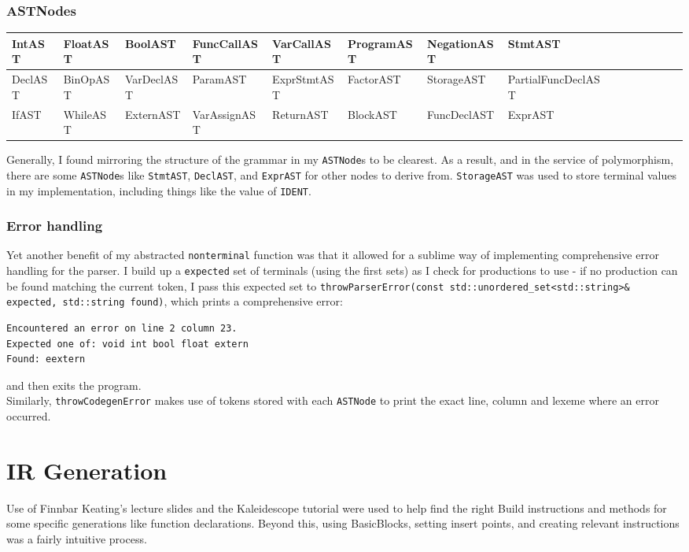 \documentclass[10pt,a4paper]{article}
\newcommand{\code}[1]{\lstinline!#1!}
\begin{document}
\subsubsection*{ASTNodes}
\begin{table}[htbp]
    \centering
    \begin{adjustbox}{center}
    \begin{tabular}{|l|l|l|l|l|l|l|l|l|l|l|l|l|l|l|}
    \hline
    IntAST & FloatAST & BoolAST & FuncCallAST & VarCallAST & ProgramAST & NegationAST & StmtAST\\
    \hline
    DeclAST & BinOpAST & VarDeclAST & ParamAST & ExprStmtAST&FactorAST & StorageAST & PartialFuncDeclAST\\
    \hline
    IfAST & WhileAST & ExternAST & VarAssignAST & ReturnAST & BlockAST & FuncDeclAST & ExprAST\\
    \hline
    \end{tabular}
\end{adjustbox}
\end{table}
\noindent Generally, I found mirroring the structure of the grammar in my \code{ASTNode}s to be clearest. As a result, and in the service of polymorphism, there are some \code{ASTNode}s like \code{StmtAST}, \code{DeclAST}, and \code{ExprAST} for other nodes to derive from.
\code{StorageAST} was used to store terminal values in my implementation, including things like the value of \code{IDENT}.
\subsubsection*{Error handling}
Yet another benefit of my abstracted \code{nonterminal} function was that it allowed for a sublime way of implementing comprehensive error handling for the parser. I build up a \code{expected} set of terminals (using the first sets) as I check for productions to use - if no production can be found matching the current token, I pass this expected set to \code{throwParserError(const std::unordered_set<std::string>& expected, std::string found)}, which prints a comprehensive error:
\begin{lstlisting}[]
Encountered an error on line 2 column 23.
Expected one of: void int bool float extern 
Found: eextern
\end{lstlisting}
and then exits the program.\\
Similarly,
\code{throwCodegenError} makes use of tokens stored with each \code{ASTNode} to print the exact line, column and lexeme where an error occurred.
\section*{IR Generation}
Use of Finnbar Keating's lecture slides and the Kaleidescope tutorial were used to help find the right Build instructions and methods for some specific generations like function declarations. Beyond this, using BasicBlocks, setting insert points, and creating relevant instructions was a fairly intuitive process.
\end{document}
